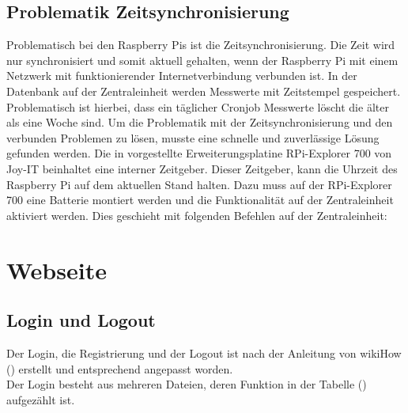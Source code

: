 \subsection{Problematik Zeitsynchronisierung}
Problematisch bei den Raspberry Pis ist die Zeitsynchronisierung. Die Zeit wird nur synchronisiert und somit aktuell gehalten, wenn der Raspberry Pi mit einem Netzwerk mit funktionierender Internetverbindung verbunden ist. In der Datenbank auf der Zentraleinheit werden Messwerte mit Zeitstempel gespeichert. Problematisch ist hierbei, dass ein täglicher Cronjob Messwerte löscht die älter als eine Woche sind. Um die Problematik mit der Zeitsynchronisierung und den verbunden Problemen zu lösen, musste eine schnelle und zuverlässige Lösung gefunden werden. Die in  vorgestellte Erweiterungsplatine RPi-Explorer 700 von Joy-IT beinhaltet eine interner Zeitgeber. Dieser Zeitgeber, kann die Uhrzeit des Raspberry Pi auf dem aktuellen Stand halten. Dazu muss auf der RPi-Explorer 700 eine Batterie montiert werden und die Funktionalität auf der Zentraleinheit aktiviert werden. Dies geschieht mit folgenden Befehlen auf der Zentraleinheit:
 
\section{Webseite}
\subsection{Login und Logout}

Der Login, die Registrierung und der Logout ist nach der Anleitung von
wikiHow (\cite{PHP-Login}) erstellt und entsprechend angepasst worden. 
\\
Der Login besteht aus mehreren Dateien, deren Funktion in der Tabelle
() aufgezählt ist.

